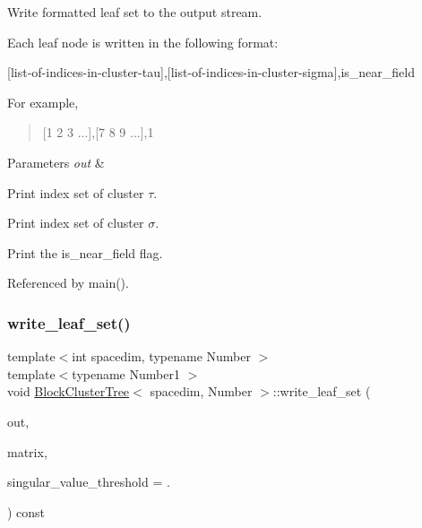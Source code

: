 Write formatted leaf set to the output stream.

Each leaf node is written in the following format\+:

\begin{quote}


\end{quote}
\mbox{[}list-\/of-\/indices-\/in-\/cluster-\/tau\mbox{]},\mbox{[}list-\/of-\/indices-\/in-\/cluster-\/sigma\mbox{]},is\+\_\+near\+\_\+field

For example,

\begin{quote}
\mbox{[}1 2 3 ...\mbox{]},\mbox{[}7 8 9 ...\mbox{]},1 \end{quote}

\begin{DoxyParams}{Parameters}
{\em out} & \\
\hline
\end{DoxyParams}
Print index set of cluster $\tau$.

Print index set of cluster $\sigma$.

Print the {\ttfamily is\+\_\+near\+\_\+field} flag.

Referenced by main().

\mbox{\label{classBlockClusterTree_a652b1c53dff2794e2f18343bf3988e19}} 
\subsubsection{\texorpdfstring{write\+\_\+leaf\+\_\+set()}{write\_leaf\_set()}\hspace{0.1cm}{\footnotesize\ttfamily [2/2]}}
{\footnotesize\ttfamily template$<$int spacedim, typename Number $>$ \\
template$<$typename Number1 $>$ \\
void \hyperlink{classBlockClusterTree}{Block\+Cluster\+Tree}$<$ spacedim, Number $>$\+::write\+\_\+leaf\+\_\+set (\begin{DoxyParamCaption}\item[{std\+::ostream \&}]{out,  }\item[{const \hyperlink{classLAPACKFullMatrixExt}{L\+A\+P\+A\+C\+K\+Full\+Matrix\+Ext}$<$ Number1 $>$ \&}]{matrix,  }\item[{const Number1}]{singular\+\_\+value\+\_\+threshold = {.} }\end{DoxyParamCaption}) const}

